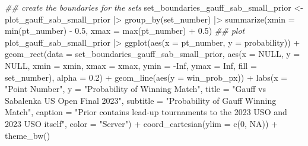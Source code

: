 \documentclass[
  letterpaper,
  DIV=11,
  numbers=noendperiod]{scrartcl}
\newenvironment{Shaded}{\begin{snugshade}}{\end{snugshade}}
\newcommand{\AttributeTok}[1]{\textcolor[rgb]{0.40,0.45,0.13}{#1}}
\newcommand{\ConstantTok}[1]{\textcolor[rgb]{0.56,0.35,0.01}{#1}}
\newcommand{\DecValTok}[1]{\textcolor[rgb]{0.68,0.00,0.00}{#1}}
\newcommand{\DocumentationTok}[1]{\textcolor[rgb]{0.37,0.37,0.37}{\textit{#1}}}
\newcommand{\FloatTok}[1]{\textcolor[rgb]{0.68,0.00,0.00}{#1}}
\newcommand{\FunctionTok}[1]{\textcolor[rgb]{0.28,0.35,0.67}{#1}}
\newcommand{\NormalTok}[1]{\textcolor[rgb]{0.00,0.23,0.31}{#1}}
\newcommand{\OtherTok}[1]{\textcolor[rgb]{0.00,0.23,0.31}{#1}}
\newcommand{\SpecialCharTok}[1]{\textcolor[rgb]{0.37,0.37,0.37}{#1}}
\newcommand{\StringTok}[1]{\textcolor[rgb]{0.13,0.47,0.30}{#1}}
\begin{document}
\begin{Shaded}
\begin{Highlighting}[]
\DocumentationTok{\#\# create the boundaries for the sets}
\NormalTok{set\_boundaries\_gauff\_sab\_small\_prior }\OtherTok{\textless{}{-}}\NormalTok{ plot\_gauff\_sab\_small\_prior }\SpecialCharTok{|\textgreater{}}
  \FunctionTok{group\_by}\NormalTok{(set\_number) }\SpecialCharTok{|\textgreater{}}
  \FunctionTok{summarize}\NormalTok{(}\AttributeTok{xmin =} \FunctionTok{min}\NormalTok{(pt\_number) }\SpecialCharTok{{-}} \FloatTok{0.5}\NormalTok{,}
            \AttributeTok{xmax =} \FunctionTok{max}\NormalTok{(pt\_number) }\SpecialCharTok{+} \FloatTok{0.5}\NormalTok{)}
\DocumentationTok{\#\# plot}
\NormalTok{plot\_gauff\_sab\_small\_prior }\SpecialCharTok{|\textgreater{}} \FunctionTok{ggplot}\NormalTok{(}\FunctionTok{aes}\NormalTok{(}\AttributeTok{x =}\NormalTok{ pt\_number, }\AttributeTok{y =}\NormalTok{ probability)) }\SpecialCharTok{+}
  \FunctionTok{geom\_rect}\NormalTok{(}\AttributeTok{data =}\NormalTok{ set\_boundaries\_gauff\_sab\_small\_prior, }
            \FunctionTok{aes}\NormalTok{(}\AttributeTok{x =} \ConstantTok{NULL}\NormalTok{, }\AttributeTok{y =} \ConstantTok{NULL}\NormalTok{, }\AttributeTok{xmin =}\NormalTok{ xmin, }\AttributeTok{xmax =}\NormalTok{ xmax, }
                \AttributeTok{ymin =} \SpecialCharTok{{-}}\ConstantTok{Inf}\NormalTok{, }\AttributeTok{ymax =} \ConstantTok{Inf}\NormalTok{, }\AttributeTok{fill =}\NormalTok{ set\_number), }\AttributeTok{alpha =} \FloatTok{0.2}\NormalTok{) }\SpecialCharTok{+} 
  \FunctionTok{geom\_line}\NormalTok{(}\FunctionTok{aes}\NormalTok{(}\AttributeTok{y =}\NormalTok{ win\_prob\_px)) }\SpecialCharTok{+}
  \FunctionTok{labs}\NormalTok{(}\AttributeTok{x =} \StringTok{"Point Number"}\NormalTok{,}
       \AttributeTok{y =} \StringTok{"Probability of Winning Match"}\NormalTok{,}
       \AttributeTok{title =} \StringTok{"Gauff vs Sabalenka US Open Final 2023"}\NormalTok{,}
       \AttributeTok{subtitle =} \StringTok{"Probability of Gauff Winning Match"}\NormalTok{,}
       \AttributeTok{caption =} \StringTok{"Prior contains \textquotesingle{}lead{-}up\textquotesingle{} tournaments to the 2023 USO and 2023 USO itself"}\NormalTok{,}
       \AttributeTok{color =} \StringTok{"Server"}\NormalTok{) }\SpecialCharTok{+}
  \FunctionTok{coord\_cartesian}\NormalTok{(}\AttributeTok{ylim =} \FunctionTok{c}\NormalTok{(}\DecValTok{0}\NormalTok{, }\ConstantTok{NA}\NormalTok{)) }\SpecialCharTok{+}
  \FunctionTok{theme\_bw}\NormalTok{()}
\end{Highlighting}
\end{Shaded}
\end{document}
